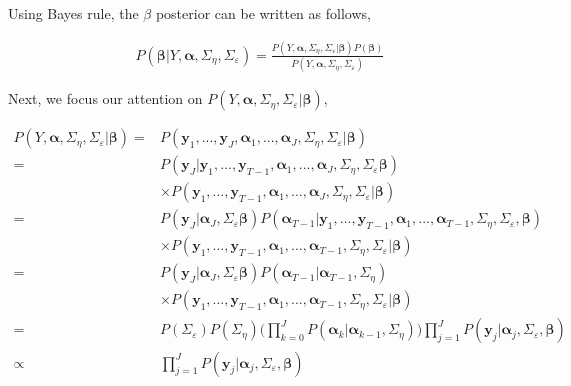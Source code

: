 \documentclass[
]{article}
\begin{document}
Using Bayes rule, the \(\beta\) posterior can be written as follows,

\begin{equation*}
\begin{aligned}
P(\boldsymbol{\beta}|Y, \boldsymbol{\alpha}, \Sigma_\eta, \Sigma_\varepsilon) = \frac{P(Y, \boldsymbol{\alpha}, \Sigma_\eta, \Sigma_\varepsilon|\boldsymbol{\beta})P(\boldsymbol{\beta})}{P(Y, \boldsymbol{\alpha}, \Sigma_\eta, \Sigma_\varepsilon)}
\end{aligned}
\end{equation*}

Next, we focus our attention on \(P(Y, \boldsymbol{\alpha}, \Sigma_\eta, \Sigma_\varepsilon|\boldsymbol{\beta})\),

\begin{equation*}
\begin{aligned}
P(Y, \boldsymbol{\alpha}, \Sigma_\eta, \Sigma_\varepsilon|\boldsymbol{\beta}) = &P(\boldsymbol{y}_1, ..., \boldsymbol{y}_J, \boldsymbol{\alpha}_1, ..., \boldsymbol{\alpha}_J, \Sigma_\eta, \Sigma_\varepsilon | \boldsymbol{\beta})\\
= & P(\boldsymbol{y}_J|\boldsymbol{y}_1, ..., \boldsymbol{y}_{T-1}, \boldsymbol{\alpha}_1, ..., \boldsymbol{\alpha}_J, \Sigma_\eta, \Sigma_\varepsilon \boldsymbol{\beta})\\
& \times P(\boldsymbol{y}_1, ..., \boldsymbol{y}_{T-1}, \boldsymbol{\alpha}_1, ..., \boldsymbol{\alpha}_J, \Sigma_\eta, \Sigma_\varepsilon | \boldsymbol{\beta})\\
= & P(\boldsymbol{y}_J|\boldsymbol{\alpha}_J, \Sigma_\varepsilon \boldsymbol{\beta})P(\boldsymbol{\alpha}_{T-1}|\boldsymbol{y}_1, ..., \boldsymbol{y}_{T-1}, \boldsymbol{\alpha}_1, ..., {\boldsymbol{\alpha}_{T-1}}, \Sigma_\eta, \Sigma_\varepsilon, \boldsymbol{\beta})\\
& \times P(\boldsymbol{y}_1, ..., \boldsymbol{y}_{T-1}, \boldsymbol{\alpha}_1, ..., {\boldsymbol{\alpha}_{T-1}}, \Sigma_\eta, \Sigma_\varepsilon | \boldsymbol{\beta})\\
= & P(\boldsymbol{y}_J|\boldsymbol{\alpha}_J, \Sigma_\varepsilon \boldsymbol{\beta})P(\boldsymbol{\alpha}_{T-1}|{\boldsymbol{\alpha}_{T-1}}, \Sigma_\eta)\\
& \times P(\boldsymbol{y}_1, ..., \boldsymbol{y}_{T-1}, \boldsymbol{\alpha}_1, ..., {\boldsymbol{\alpha}_{T-1}}, \Sigma_\eta, \Sigma_\varepsilon | \boldsymbol{\beta})\\
= &P(\Sigma_\varepsilon)P(\Sigma_\eta)\bigg(\prod^J_{k=0} P(\boldsymbol{\alpha}_k|\boldsymbol{\alpha}_{k-1},\Sigma_{\eta})\bigg) \prod^J_{j=1} P(\boldsymbol{y}_j|\boldsymbol{\alpha}_j, \Sigma_\varepsilon, \boldsymbol{\beta})\\
\propto & \prod^J_{j=1} P(\boldsymbol{y}_j|\boldsymbol{\alpha}_j, \Sigma_\varepsilon, \boldsymbol{\beta})
\end{aligned}
\end{equation*}
\end{document}
